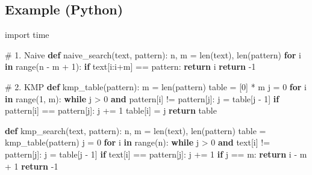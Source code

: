 \documentclass[
  letterpaper,
  DIV=11,
  numbers=noendperiod]{scrreprt}
\newenvironment{Shaded}{\begin{snugshade}}{\end{snugshade}}
\newcommand{\BuiltInTok}[1]{\textcolor[rgb]{0.00,0.23,0.31}{#1}}
\newcommand{\CommentTok}[1]{\textcolor[rgb]{0.37,0.37,0.37}{#1}}
\newcommand{\ControlFlowTok}[1]{\textcolor[rgb]{0.00,0.23,0.31}{\textbf{#1}}}
\newcommand{\DecValTok}[1]{\textcolor[rgb]{0.68,0.00,0.00}{#1}}
\newcommand{\ImportTok}[1]{\textcolor[rgb]{0.00,0.46,0.62}{#1}}
\newcommand{\KeywordTok}[1]{\textcolor[rgb]{0.00,0.23,0.31}{\textbf{#1}}}
\newcommand{\NormalTok}[1]{\textcolor[rgb]{0.00,0.23,0.31}{#1}}
\newcommand{\OperatorTok}[1]{\textcolor[rgb]{0.37,0.37,0.37}{#1}}
\begin{document}
\subsection{Example (Python)}\label{example-python-8}

\begin{Shaded}
\begin{Highlighting}[]
\ImportTok{import}\NormalTok{ time}

\CommentTok{\# 1. Naive}
\KeywordTok{def}\NormalTok{ naive\_search(text, pattern):}
\NormalTok{    n, m }\OperatorTok{=} \BuiltInTok{len}\NormalTok{(text), }\BuiltInTok{len}\NormalTok{(pattern)}
    \ControlFlowTok{for}\NormalTok{ i }\KeywordTok{in} \BuiltInTok{range}\NormalTok{(n }\OperatorTok{{-}}\NormalTok{ m }\OperatorTok{+} \DecValTok{1}\NormalTok{):}
        \ControlFlowTok{if}\NormalTok{ text[i:i}\OperatorTok{+}\NormalTok{m] }\OperatorTok{==}\NormalTok{ pattern:}
            \ControlFlowTok{return}\NormalTok{ i}
    \ControlFlowTok{return} \OperatorTok{{-}}\DecValTok{1}

\CommentTok{\# 2. KMP}
\KeywordTok{def}\NormalTok{ kmp\_table(pattern):}
\NormalTok{    m }\OperatorTok{=} \BuiltInTok{len}\NormalTok{(pattern)}
\NormalTok{    table }\OperatorTok{=}\NormalTok{ [}\DecValTok{0}\NormalTok{] }\OperatorTok{*}\NormalTok{ m}
\NormalTok{    j }\OperatorTok{=} \DecValTok{0}
    \ControlFlowTok{for}\NormalTok{ i }\KeywordTok{in} \BuiltInTok{range}\NormalTok{(}\DecValTok{1}\NormalTok{, m):}
        \ControlFlowTok{while}\NormalTok{ j }\OperatorTok{\textgreater{}} \DecValTok{0} \KeywordTok{and}\NormalTok{ pattern[i] }\OperatorTok{!=}\NormalTok{ pattern[j]:}
\NormalTok{            j }\OperatorTok{=}\NormalTok{ table[j }\OperatorTok{{-}} \DecValTok{1}\NormalTok{]}
        \ControlFlowTok{if}\NormalTok{ pattern[i] }\OperatorTok{==}\NormalTok{ pattern[j]:}
\NormalTok{            j }\OperatorTok{+=} \DecValTok{1}
\NormalTok{            table[i] }\OperatorTok{=}\NormalTok{ j}
    \ControlFlowTok{return}\NormalTok{ table}

\KeywordTok{def}\NormalTok{ kmp\_search(text, pattern):}
\NormalTok{    n, m }\OperatorTok{=} \BuiltInTok{len}\NormalTok{(text), }\BuiltInTok{len}\NormalTok{(pattern)}
\NormalTok{    table }\OperatorTok{=}\NormalTok{ kmp\_table(pattern)}
\NormalTok{    j }\OperatorTok{=} \DecValTok{0}
    \ControlFlowTok{for}\NormalTok{ i }\KeywordTok{in} \BuiltInTok{range}\NormalTok{(n):}
        \ControlFlowTok{while}\NormalTok{ j }\OperatorTok{\textgreater{}} \DecValTok{0} \KeywordTok{and}\NormalTok{ text[i] }\OperatorTok{!=}\NormalTok{ pattern[j]:}
\NormalTok{            j }\OperatorTok{=}\NormalTok{ table[j }\OperatorTok{{-}} \DecValTok{1}\NormalTok{]}
        \ControlFlowTok{if}\NormalTok{ text[i] }\OperatorTok{==}\NormalTok{ pattern[j]:}
\NormalTok{            j }\OperatorTok{+=} \DecValTok{1}
            \ControlFlowTok{if}\NormalTok{ j }\OperatorTok{==}\NormalTok{ m:}
                \ControlFlowTok{return}\NormalTok{ i }\OperatorTok{{-}}\NormalTok{ m }\OperatorTok{+} \DecValTok{1}
    \ControlFlowTok{return} \OperatorTok{{-}}\DecValTok{1}


\end{Highlighting}
\end{Shaded}
\end{document}
